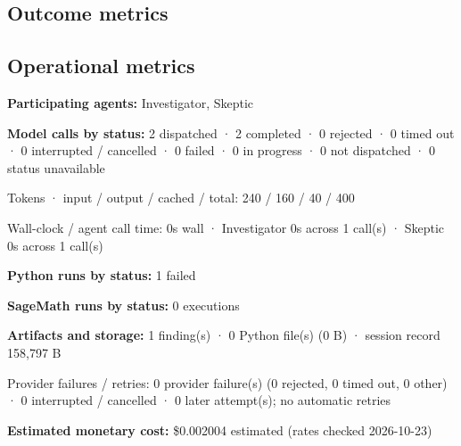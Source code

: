 \documentclass[11pt]{article}
\begin{document}
\subsection{Outcome metrics}
\subsection{Operational metrics}
\textbf{Participating agents:} Investigator, Skeptic\par
\textbf{Model calls by status:} 2 dispatched · 2 completed · 0 rejected · 0 timed out · 0 interrupted / cancelled · 0 failed · 0 in progress · 0 not dispatched · 0 status unavailable\par
Tokens · input / output / cached / total: 240 / 160 / 40 / 400\par
Wall-clock / agent call time: 0s wall · Investigator 0s across 1 call(s) · Skeptic 0s across 1 call(s)\par
\textbf{Python runs by status:} 1 failed\par
\textbf{SageMath runs by status:} 0 executions\par
\textbf{Artifacts and storage:} 1 finding(s) · 0 Python file(s) (0 B) · session record 158,797 B\par
Provider failures / retries: 0 provider failure(s) (0 rejected, 0 timed out, 0 other) · 0 interrupted / cancelled · 0 later attempt(s); no automatic retries\par
\textbf{Estimated monetary cost:} \$0.002004 estimated (rates checked 2026-10-23)\par
\end{document}
